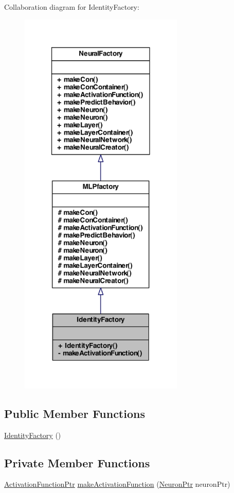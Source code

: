 Collaboration diagram for IdentityFactory:\nopagebreak
\begin{figure}[H]
\begin{center}
\leavevmode
\includegraphics[width=222pt]{class_identity_factory__coll__graph}
\end{center}
\end{figure}
\subsection*{Public Member Functions}
\begin{DoxyCompactItemize}
\item 
\hyperlink{class_identity_factory_ae11ff3d50097edf8db7a7b16c81e44b4}{IdentityFactory} ()
\end{DoxyCompactItemize}
\subsection*{Private Member Functions}
\begin{DoxyCompactItemize}
\item 
\hyperlink{_a_m_o_r_e_8h_a77602a0277a02e5769c3df0adc669b17}{ActivationFunctionPtr} \hyperlink{class_identity_factory_a13a9bb3996539b46c4d9eee7c2024ea1}{makeActivationFunction} (\hyperlink{_a_m_o_r_e_8h_ac1ea936c2c7728eb382278131652fef4}{NeuronPtr} neuronPtr)
\end{DoxyCompactItemize}


